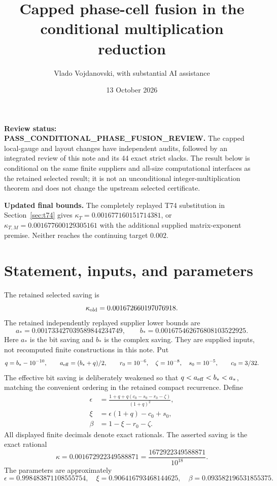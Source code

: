 \documentclass[11pt]{article}
\title{Capped phase-cell fusion in the conditional multiplication reduction}
\author{Vlado Vojdanovski, with substantial AI assistance}
\date{13 October 2026}
\begin{document}
\maketitle

\noindent\textbf{Review status: PASS\_CONDITIONAL\_PHASE\_FUSION\_REVIEW.} The capped local-gauge and layout changes have independent audits, followed by an integrated review of this note and its 44 exact strict slacks. The result below is conditional on the same finite suppliers and all-size computational interfaces as the retained selected result; it is not an unconditional integer-multiplication theorem and does not change the upstream selected certificate.

\noindent\textbf{Updated final bounds.} The completely replayed T74 substitution in Section~\ref{sec:t74} gives $\kappa_T=0.001677160151714381$, or $\kappa_{T,M}=0.001677600129305161$ with the additional supplied matrix-exponent premise. Neither reaches the continuing target $0.002$.

\section{Statement, inputs, and parameters}

The retained selected saving is
\[
 \kappa_{\rm old}=0.001672660197076918.
\]
The retained independently replayed supplier lower bounds are
\[
 a_*=0.001733427039589844234749,\qquad
 b_*=0.001675462676808103522925.
\]
Here $a_*$ is the bit saving and $b_*$ is the complex saving. They are supplied inputs, not recomputed finite constructions in this note. Put
\[
 q=b_*-10^{-10},\qquad a_{\rm eff}=(b_*+q)/2,
 \qquad r_0=10^{-6},\quad \zeta=10^{-8},\quad s_0=10^{-5},
 \qquad c_0=3/32.
\]
The effective bit saving is deliberately weakened so that
$q<a_{\rm eff}<b_*<a_*$, matching the convenient ordering in the retained compact recurrence. Define
\begin{align}
 \epsilon&=\frac{1+q+q(c_0-s_0-r_0-\zeta)}{(1+q)^2},\\
 \xi&=\epsilon(1+q)-c_0+s_0,\\
 \beta&=1-\xi-r_0-\zeta.
\end{align}
All displayed finite decimals denote exact rationals. The asserted saving is the exact rational
\[
 \boxed{\kappa=0.001672922349588871
       =\frac{1672922349588871}{10^{18}}.}
\]
The parameters are approximately
\[
 \epsilon=0.998483871108555754,\quad
 \xi=0.906416793468144625,\quad
 \beta=0.093582196531855375.
\]
\end{document}
